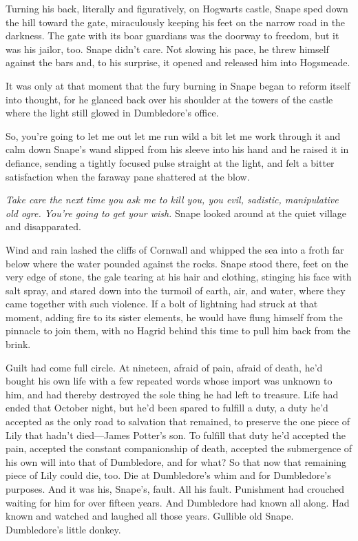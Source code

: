 Turning his back, literally and figuratively, on Hogwarts castle, Snape sped down the hill toward the gate, miraculously keeping his feet on the narrow road in the darkness. The gate with its boar guardians was the doorway to freedom, but it was his jailor, too. Snape didn't care. Not slowing his pace, he threw himself against the bars and, to his surprise, it opened and released him into Hogsmeade.

It was only at that moment that the fury burning in Snape began to reform itself into thought, for he glanced back over his shoulder at the towers of the castle where the light still glowed in Dumbledore's office.

So, you're going to let me out{\el} let me run wild a bit{\el} let me work through it and calm down{\el} Snape's wand slipped from his sleeve into his hand and he raised it in defiance, sending a tightly focused pulse straight at the light, and felt a bitter satisfaction when the faraway pane shattered at the blow.

\emph{Take care the next time you ask me to kill you, you evil, sadistic, manipulative old ogre. You're going to get your wish.} Snape looked around at the quiet village and disapparated.

Wind and rain lashed the cliffs of Cornwall and whipped the sea into a froth far below where the water pounded against the rocks. Snape stood there, feet on the very edge of stone, the gale tearing at his hair and clothing, stinging his face with salt spray, and stared down into the turmoil of earth, air, and water, where they came together with such violence. If a bolt of lightning had struck at that moment, adding fire to its sister elements, he would have flung himself from the pinnacle to join them, with no Hagrid behind this time to pull him back from the brink.

Guilt had come full circle. At nineteen, afraid of pain, afraid of death, he'd bought his own life with a few repeated words whose import was unknown to him, and had thereby destroyed the sole thing he had left to treasure. Life had ended that October night, but he'd been spared to fulfill a duty, a duty he'd accepted as the only road to salvation that remained, to preserve the one piece of Lily that hadn't died—James Potter's son. To fulfill that duty he'd accepted the pain, accepted the constant companionship of death, accepted the submergence of his own will into that of Dumbledore, and for what? So that now that remaining piece of Lily could die, too. Die at Dumbledore's whim and for Dumbledore's purposes. And it was his, Snape's, fault. All his fault. Punishment had crouched waiting for him for over fifteen years. And Dumbledore had known all along. Had known and watched and laughed all those years. Gullible old Snape. Dumbledore's little donkey.

